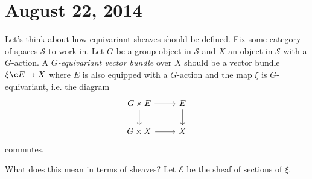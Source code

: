 \section{August 22, 2014}

\renewcommand{\S}{\mathcal{S}}
\renewcommand{\E}{\mathcal{E}}
\begin{nothing}
  Let's think about how equivariant sheaves should be defined. Fix
  some category of spaces $\S$ to work in. Let $G$ be a group object
  in $\S$ and $X$ an object in $\S$ with a $G$-action. A
  \emph{$G$-equivariant vector bundle} over $X$ should be a vector
  bundle $\xi \c E \to X$ where $E$ is also equipped with a $G$-action
  and the map $\xi$ is $G$-equivariant, i.e. the diagram
  \[
  \begin{tikzcd}
    G \times E \ar[r] \ar[d] & E \ar[d] \\ G \times X \ar[r] & X
  \end{tikzcd}
  \]
  commutes.
  
  What does this mean in terms of sheaves? Let $\E$ be the sheaf of
  sections of $\xi$.
\end{nothing}